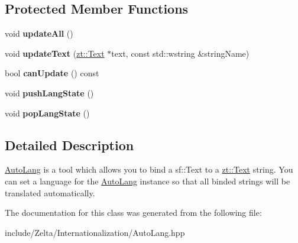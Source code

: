 \subsection*{Protected Member Functions}
\begin{DoxyCompactItemize}
\item 
\mbox{\label{classzt_1_1_auto_lang_a06bfb5279221ab3e007a521b9a3f0fb5}} 
void {\bfseries update\+All} ()
\item 
\mbox{\label{classzt_1_1_auto_lang_a194ab30c376540c1acab8d6e7a472646}} 
void {\bfseries update\+Text} (\hyperlink{classzt_1_1_text}{zt\+::\+Text} $\ast$text, const std\+::wstring \&string\+Name)
\item 
\mbox{\label{classzt_1_1_auto_lang_a1027c1a6e6f6068893c182a27a35b21f}} 
bool {\bfseries can\+Update} () const
\item 
\mbox{\label{classzt_1_1_auto_lang_a3041f0b41d3b97e6930b7caaad2fae58}} 
void {\bfseries push\+Lang\+State} ()
\item 
\mbox{\label{classzt_1_1_auto_lang_aa3f06d508e00550f42aea5ab8720c54f}} 
void {\bfseries pop\+Lang\+State} ()
\end{DoxyCompactItemize}


\subsection{Detailed Description}
\hyperlink{classzt_1_1_auto_lang}{Auto\+Lang} is a tool which allows you to bind a sf\+::\+Text to a \hyperlink{classzt_1_1_text}{zt\+::\+Text} string. You can set a language for the \hyperlink{classzt_1_1_auto_lang}{Auto\+Lang} instance so that all binded strings will be translated automatically. 

The documentation for this class was generated from the following file\+:\begin{DoxyCompactItemize}
\item 
include/\+Zelta/\+Internationalization/Auto\+Lang.\+hpp\end{DoxyCompactItemize}
